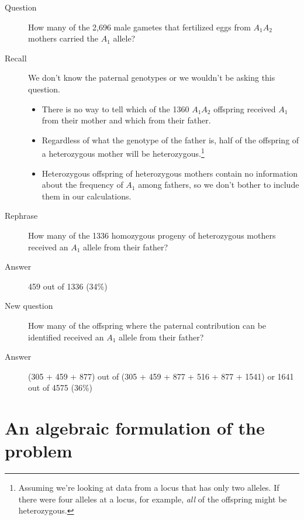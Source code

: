 \begin{description}

\item[Question] How many of the 2,696 male gametes that fertilized
eggs from $A_1A_2$ mothers carried the $A_1$ allele?

\item[Recall] We don't know the paternal genotypes or we wouldn't be
asking this question.

\begin{itemize}

\item There is no way to tell which of the 1360 $A_1A_2$ offspring
  received $A_1$ from their mother and which from their father.

\item Regardless of what the genotype of the father is, half of the
  offspring of a heterozygous mother will be
  heterozygous.\footnote{Assuming we're looking at data from a locus
    that has only two alleles. If there were four alleles at a locus,
    for example, {\it all\/} of the offspring might be heterozygous.}

\item Heterozygous offspring of heterozygous mothers contain no
information about the frequency of $A_1$ among fathers, so we don't
bother to include them in our calculations.

\end{itemize}

\item[Rephrase] How many of the 1336 homozygous progeny of
heterozygous mothers received an $A_1$ allele from their father?

\item[Answer] 459 out of 1336 (34\%)

\item[New question] How many of the offspring where the paternal
contribution can be identified received an $A_1$ allele from their
father?

\item[Answer] (305 + 459 + 877) out of (305 + 459 + 877 + 516 + 877 +
1541) or 1641 out of 4575 (36\%)

\end{description}

\section*{An algebraic formulation of the problem}

